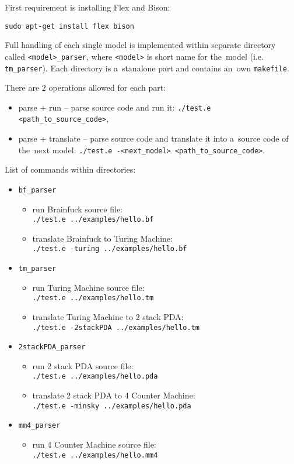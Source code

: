 \documentclass[english,shortabstract,mgr]{iithesis}
\begin{document}
First requirement is installing Flex and Bison:

\texttt{sudo apt-get install flex bison}

Full handling of each single model is implemented within separate directory called
\texttt{<model>\_parser}, where \texttt{<model>} is short name for the~model
(i.e. \texttt{tm\_parser}). Each directory is a~stanalone part and contains
an~own \texttt{makefile}.

There are $2$ operations allowed for each part:
\begin{itemize}
  \item parse + run -- parse source code and run it: \texttt{./test.e <path\_to\_source\_code>},
  \item parse + translate -- parse source code and translate it into a~source code
      of the~next model: \texttt{./test.e -<next\_model> <path\_to\_source\_code>}.
\end{itemize}

List of commands within directories:
\begin{itemize}
  \item \texttt{bf\_parser}
    \begin{itemize}
      \item run Brainfuck source file: \\ \texttt{./test.e ../examples/hello.bf}
      \item translate Brainfuck to Turing Machine: \\ \texttt{./test.e -turing ../examples/hello.bf}
    \end{itemize}
  \item \texttt{tm\_parser}
    \begin{itemize}
      \item run Turing Machine source file: \\ \texttt{./test.e ../examples/hello.tm}
      \item translate Turing Machine to 2 stack PDA: \\ \texttt{./test.e -2stackPDA ../examples/hello.tm}
    \end{itemize}
  \item \texttt{2stackPDA\_parser}
    \begin{itemize}
      \item run 2 stack PDA source file: \\ \texttt{./test.e ../examples/hello.pda}
      \item translate 2 stack PDA to 4 Counter Machine: \\ \texttt{./test.e -minsky ../examples/hello.pda}
    \end{itemize}
  \item \texttt{mm4\_parser}
    \begin{itemize}
      \item run 4 Counter Machine source file: \\ \texttt{./test.e ../examples/hello.mm4}
    \end{itemize}
\end{itemize}
\end{document}
